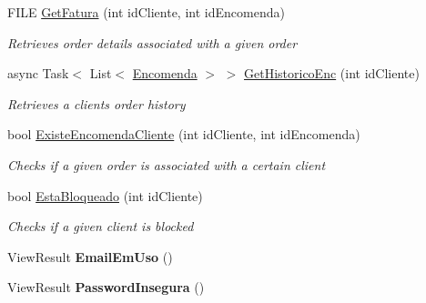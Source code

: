 \begin{DoxyCompactItemize}
F\+I\+LE \mbox{\hyperlink{classmvc_j_j_m_s_1_1_controllers_1_1_cliente_controller_afa8996759fcf65477a9aac44cd0c9810}{Get\+Fatura}} (int id\+Cliente, int id\+Encomenda)
\begin{DoxyCompactList}\small\item\em Retrieves order details associated with a given order \end{DoxyCompactList}\item 
async Task$<$ List$<$ \mbox{\hyperlink{classmvc_j_j_m_s_1_1_models_1_1_encomenda}{Encomenda}} $>$ $>$ \mbox{\hyperlink{classmvc_j_j_m_s_1_1_controllers_1_1_cliente_controller_a2023d96fe1797ec7673210da1233dfe2}{Get\+Historico\+Enc}} (int id\+Cliente)
\begin{DoxyCompactList}\small\item\em Retrieves a client\textquotesingle{}s order history \end{DoxyCompactList}\item 
bool \mbox{\hyperlink{classmvc_j_j_m_s_1_1_controllers_1_1_cliente_controller_a5ab387b5c0be1e73a0ec1c468cc3ac5e}{Existe\+Encomenda\+Cliente}} (int id\+Cliente, int id\+Encomenda)
\begin{DoxyCompactList}\small\item\em Checks if a given order is associated with a certain client \end{DoxyCompactList}\item 
bool \mbox{\hyperlink{classmvc_j_j_m_s_1_1_controllers_1_1_cliente_controller_ab916e41bf8757268e95796c1cf86d3df}{Esta\+Bloqueado}} (int id\+Cliente)
\begin{DoxyCompactList}\small\item\em Checks if a given client is blocked \end{DoxyCompactList}\item 
\mbox{\label{classmvc_j_j_m_s_1_1_controllers_1_1_cliente_controller_abe5a6649f29f0a35046839bad04523ef}} 
View\+Result {\bfseries Email\+Em\+Uso} ()
\item 
\mbox{\label{classmvc_j_j_m_s_1_1_controllers_1_1_cliente_controller_a5fcddb32b175cb22a90b8dbaca7a45bb}} 
View\+Result {\bfseries Password\+Insegura} ()
\item 
\mbox{\label{classmvc_j_j_m_s_1_1_controllers_1_1_cliente_controller_aa66f3fb47fd4c21a67514ef6a38a8390}} 

\end{DoxyCompactItemize}

